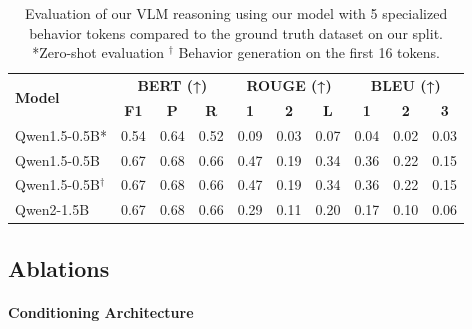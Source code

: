\documentclass[letterpaper, 10 pt, conference]{ieeeconf}
\begin{document}
\begingroup
\setlength{\tabcolsep}{3pt} %
\begin{table}[]
\vspace{2mm}
    \caption{Evaluation of our VLM reasoning using our model with 5 specialized behavior tokens compared to the ground truth dataset on our split. *Zero-shot evaluation $^{\dagger}$ Behavior generation on the first 16 tokens.}
    \centering
    \begin{tabular}{l|ccc|ccc|ccc}

        \multirow{2}{*}{\textbf{Model}} &
        \multicolumn{3}{c|}{\textbf{ BERT (↑)}} &
        \multicolumn{3}{c|}{\textbf{ROUGE (↑)}} &
        \multicolumn{3}{c}{\textbf{BLEU (↑)}} \\
        & \textbf{F1} & \textbf{P} & \textbf{R}
        & \textbf{1} & \textbf{2} & \textbf{L}
        & \textbf{1} & \textbf{2} & \textbf{3}  \\
        \hline
        Qwen1.5-0.5B*
        & 0.54 & 0.64 & 0.52
        & 0.09 & 0.03 & 0.07
        & 0.04 & 0.02 & 0.03 \\


        Qwen1.5-0.5B
        & 0.67 & 0.68 & 0.66
        & 0.47 & 0.19 & 0.34
        & 0.36 & 0.22 & 0.15 %
        \\

             Qwen1.5-0.5B$^{\dagger}$
      & 0.67 & 0.68 &  0.66
        & 0.47 & 0.19 &  0.34

        & 0.36 &  0.22 & 0.15 \\
        
        Qwen2-1.5B
        &  0.67 & 0.68 & 0.66 
        & 0.29 & 0.11 &  0.20

        & 0.17 & 0.10 & 0.06  \\

    \end{tabular}
    \label{tab:nlp-metrics}

\end{table}
\endgroup



\subsection{Ablations}\label{subsec:ablation}

\paragraph{Conditioning Architecture}
\end{document}
